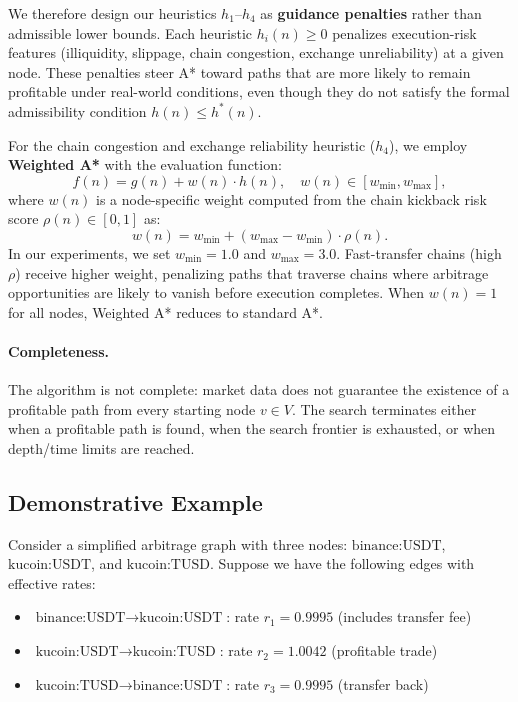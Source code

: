 We therefore design our heuristics $h_1$--$h_4$ as \textbf{guidance penalties} rather than admissible lower bounds. Each heuristic $h_i(n) \geq 0$ penalizes execution-risk features (illiquidity, slippage, chain congestion, exchange unreliability) at a given node. These penalties steer A* toward paths that are more likely to remain profitable under real-world conditions, even though they do not satisfy the formal admissibility condition $h(n) \leq h^*(n)$.

For the chain congestion and exchange reliability heuristic ($h_4$), we employ \textbf{Weighted A*} with the evaluation function:
\[
f(n) = g(n) + w(n) \cdot h(n), \quad w(n) \in [w_{\min}, w_{\max}],
\]
where $w(n)$ is a node-specific weight computed from the chain kickback risk score $\rho(n) \in [0,1]$ as:
\[
w(n) = w_{\min} + (w_{\max} - w_{\min}) \cdot \rho(n).
\]
In our experiments, we set $w_{\min} = 1.0$ and $w_{\max} = 3.0$. Fast-transfer chains (high $\rho$) receive higher weight, penalizing paths that traverse chains where arbitrage opportunities are likely to vanish before execution completes. When $w(n)=1$ for all nodes, Weighted A* reduces to standard A*.

\paragraph{Completeness.}
The algorithm is not complete: market data does not guarantee the existence of a profitable path from every starting node $v \in V$. The search terminates either when a profitable path is found, when the search frontier is exhausted, or when depth/time limits are reached.


\subsection{Demonstrative Example}

Consider a simplified arbitrage graph with three nodes: $\text{binance:USDT}$, $\text{kucoin:USDT}$, and $\text{kucoin:TUSD}$. Suppose we have the following edges with effective rates:

\begin{itemize}
\item $\text{binance:USDT} \to \text{kucoin:USDT}$: rate $r_1 = 0.9995$ (includes transfer fee)
\item $\text{kucoin:USDT} \to \text{kucoin:TUSD}$: rate $r_2 = 1.0042$ (profitable trade)
\item $\text{kucoin:TUSD} \to \text{binance:USDT}$: rate $r_3 = 0.9995$ (transfer back)
\end{itemize}

